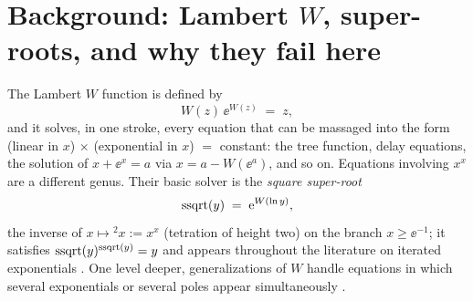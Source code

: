 \section{Background: Lambert \boldmath$W$\unboldmath, super-roots, and
why they fail here}\label{sec:background}

The Lambert $W$ function \cite{corless} is defined by
\begin{equation}\label{eq:W-def}
    W(z)\,\ee^{W(z)} \;=\; z ,
\end{equation}
and it solves, in one stroke, every equation that can be massaged into
the form (linear in $x$) $\times$ (exponential in $x$) $=$ constant: the
tree function, delay equations, the solution of $x + \ee^{x} = a$ via
$x = a - W(\ee^{a})$, and so on. Equations involving $x^{x}$ are a
different genus. Their basic solver is the \emph{square super-root}
\begin{equation}\label{eq:ssqrt}
    \operatorname{ssqrt}(y) \;=\; \mathrm{e}^{W(\ln y)} ,
\end{equation}
the inverse of $x \mapsto {}^{2}x := x^{x}$ (tetration of height two) on
the branch $x \ge \ee^{-1}$; it satisfies $\operatorname{ssqrt}(y)^{\operatorname{ssqrt}(y)} = y$ and
appears throughout the literature on iterated exponentials
\cite{knoebel}. One level deeper, generalizations of $W$ handle
equations in which several exponentials or several poles appear
simultaneously \cite{mezobaricz}.

